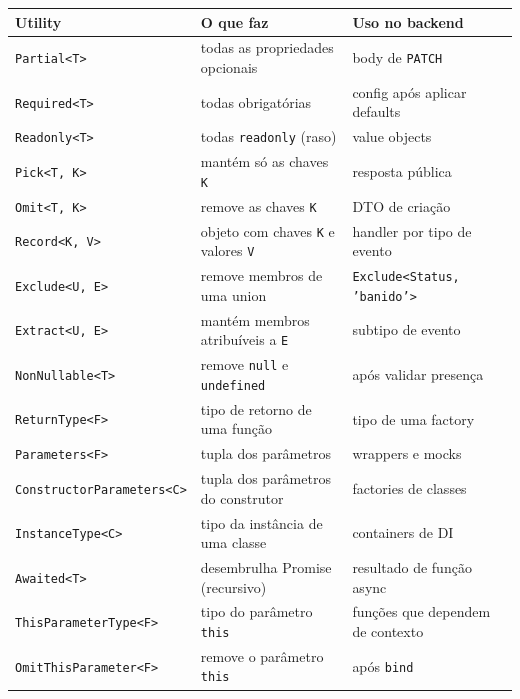\documentclass[12pt,a4paper,oneside]{book}
\newcommand{\code}[1]{\texttt{#1}}
\begin{document}
{\small
\begin{tabularx}{\textwidth}{@{}lXX@{}}
\toprule
\textbf{Utility} & \textbf{O que faz} & \textbf{Uso no backend} \\
\midrule
\code{Partial<T>} & todas as propriedades opcionais & body de \code{PATCH} \\
\code{Required<T>} & todas obrigatórias & config após aplicar defaults \\
\code{Readonly<T>} & todas \code{readonly} (raso) & value objects \\
\code{Pick<T, K>} & mantém só as chaves \code{K} & resposta pública \\
\code{Omit<T, K>} & remove as chaves \code{K} & DTO de criação \\
\code{Record<K, V>} & objeto com chaves \code{K} e valores \code{V} & handler por tipo de evento \\
\code{Exclude<U, E>} & remove membros de uma union & \code{Exclude<Status, 'banido'>} \\
\code{Extract<U, E>} & mantém membros atribuíveis a \code{E} & subtipo de evento \\
\code{NonNullable<T>} & remove \code{null} e \code{undefined} & após validar presença \\
\code{ReturnType<F>} & tipo de retorno de uma função & tipo de uma factory \\
\code{Parameters<F>} & tupla dos parâmetros & wrappers e mocks \\
\code{ConstructorParameters<C>} & tupla dos parâmetros do construtor & factories de classes \\
\code{InstanceType<C>} & tipo da instância de uma classe & containers de DI \\
\code{Awaited<T>} & desembrulha Promise (recursivo) & resultado de função async \\
\code{ThisParameterType<F>} & tipo do parâmetro \code{this} & funções que dependem de contexto \\
\code{OmitThisParameter<F>} & remove o parâmetro \code{this} & após \code{bind} \\
\bottomrule
\end{tabularx}
}
\end{document}
